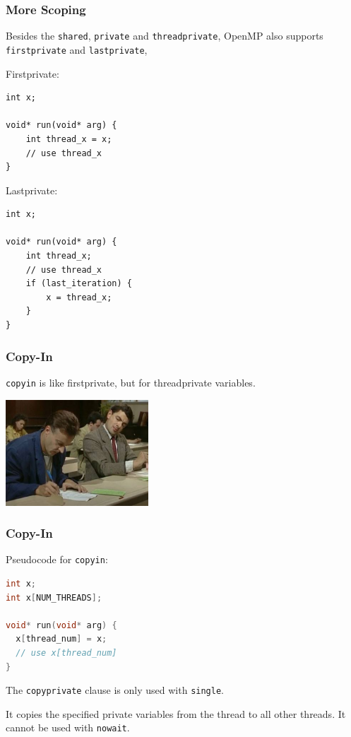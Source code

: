 \begin{frame}[fragile]
\frametitle{More Scoping}

Besides the {\tt shared}, {\tt private} and {\tt threadprivate}, OpenMP also 
supports {\tt firstprivate} and {\tt lastprivate},

Firstprivate:
  \begin{lstlisting}
int x;

void* run(void* arg) {
    int thread_x = x;
    // use thread_x
}
  \end{lstlisting}


Lastprivate:
  \begin{lstlisting}
int x;

void* run(void* arg) {
    int thread_x;
    // use thread_x
    if (last_iteration) {
        x = thread_x;
    }
}
  \end{lstlisting}

\end{frame}


\begin{frame}
\frametitle{Copy-In}

{\tt copyin} is like firstprivate, but for threadprivate variables.


\begin{center}
	\includegraphics[width=0.4\textwidth]{images/copying.png}
\end{center}


\end{frame}

\begin{frame}[fragile]
\frametitle{Copy-In}

Pseudocode for {\tt copyin}:
  \begin{lstlisting}[language=C]
int x;
int x[NUM_THREADS];

void* run(void* arg) {
  x[thread_num] = x;
  // use x[thread_num]
}
  \end{lstlisting}

The {\tt copyprivate} clause is only used with {\tt single}.


It copies the specified private variables from the thread to all other
threads. It cannot be used with {\tt nowait}.

\end{frame}



